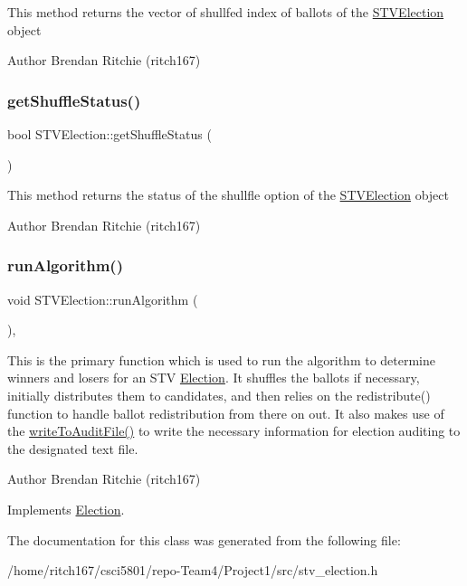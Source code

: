 This method returns the vector of shullfed index of ballots of the \hyperlink{classSTVElection}{S\+T\+V\+Election} object \begin{DoxyAuthor}{Author}
Brendan Ritchie (ritch167) 
\end{DoxyAuthor}
\mbox{\label{classSTVElection_aa8597739fd9823bbe8ea5a7fdb741f53}} 
\subsubsection{\texorpdfstring{get\+Shuffle\+Status()}{getShuffleStatus()}}
{\footnotesize\ttfamily bool S\+T\+V\+Election\+::get\+Shuffle\+Status (\begin{DoxyParamCaption}{ }\end{DoxyParamCaption})}

This method returns the status of the shullfle option of the \hyperlink{classSTVElection}{S\+T\+V\+Election} object \begin{DoxyAuthor}{Author}
Brendan Ritchie (ritch167) 
\end{DoxyAuthor}
\mbox{\label{classSTVElection_ac4e0339e3cb97add1a22c9af7233df17}} 
\subsubsection{\texorpdfstring{run\+Algorithm()}{runAlgorithm()}}
{\footnotesize\ttfamily void S\+T\+V\+Election\+::run\+Algorithm (\begin{DoxyParamCaption}{ }\end{DoxyParamCaption})\hspace{0.3cm}{\ttfamily [override]}, {\ttfamily [virtual]}}

This is the primary function which is used to run the algorithm to determine winners and losers for an S\+TV \hyperlink{classElection}{Election}. It shuffles the ballots if necessary, initially distributes them to candidates, and then relies on the redistribute() function to handle ballot redistribution from there on out. It also makes use of the \hyperlink{classElection_abd52b6c894a9f2a0a0a104e9f290f9a7}{write\+To\+Audit\+File()} to write the necessary information for election auditing to the designated text file. \begin{DoxyAuthor}{Author}
Brendan Ritchie (ritch167) 
\end{DoxyAuthor}


Implements \hyperlink{classElection_a059659576ebb0416ecd8005f684461d6}{Election}.



The documentation for this class was generated from the following file\+:\begin{DoxyCompactItemize}
\item 
/home/ritch167/csci5801/repo-\/\+Team4/\+Project1/src/stv\+\_\+election.\+h\end{DoxyCompactItemize}

